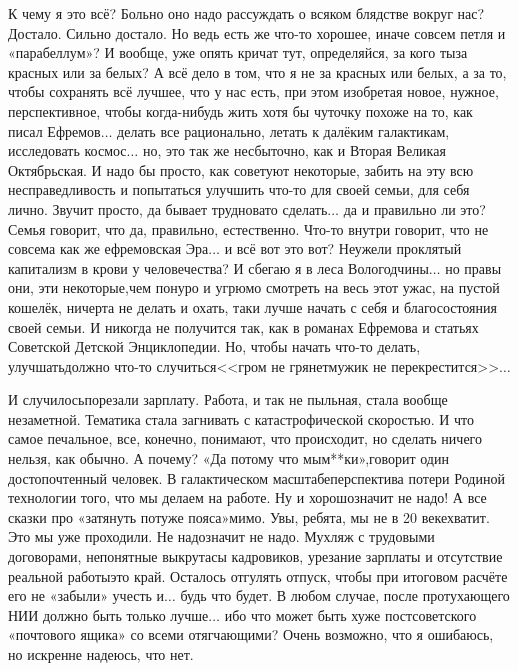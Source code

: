 К чему я это всё? Больно оно надо рассуждать о всяком блядстве вокруг нас? Достало. Сильно достало. Но ведь есть же что-то хорошее, иначе совсем петля и «парабеллум»? И вообще, уже опять кричат тут, определяйся, за кого ты\mdash за красных или за белых? А всё дело в том, что я не за красных или белых, а за то, чтобы сохранять всё лучшее, что у нас есть, при этом изобретая новое, нужное, перспективное, чтобы когда-нибудь жить хотя бы чуточку похоже на то, как писал Ефремов$\ldots$ делать все рационально, летать к далёким галактикам, исследовать космос$\ldots$ но, это так же несбыточно, как и Вторая Великая Октябрьская. И надо бы просто, как советуют некоторые, забить на эту всю несправедливость и попытаться улучшить что-то для своей семьи, для себя лично. Звучит просто, да бывает трудновато сделать$\ldots$ да и правильно ли это? Семья говорит, что да, правильно, естественно. Что-то внутри говорит, что не совсем\mdash а как же ефремовская Эра$\ldots$ и всё вот это вот? Неужели проклятый капитализм в крови у человечества? И сбегаю я в леса Вологодчины$\ldots$ но правы они, эти некоторые,\mdash чем понуро и угрюмо смотреть на весь этот ужас, на пустой кошелёк, ничерта не делать и охать, таки лучше начать с себя и благосостояния своей семьи. И никогда не получится так, как в романах Ефремова и статьях Советской Детской Энциклопедии. Но, чтобы начать что-то делать, улучшать\mdash должно что-то случиться\mdash <<гром не грянет\mdash мужик не перекрестится>>$\ldots$ 

И случилось\mdash порезали зарплату. Работа, и так не пыльная, стала вообще незаметной. Тематика стала загнивать с катастрофической скоростью. И что самое печальное, все, конечно, понимают, что происходит, но сделать ничего нельзя, как обычно. А почему? «Да потому что мы\mdash м**ки»,\mdash говорит один достопочтенный человек. В галактическом масштабе\mdash перспектива потери Родиной технологии того, что мы делаем на работе. Ну и хорошо\mdash значит не надо! А все сказки про «затянуть потуже пояса»\mdash мимо. Увы, ребята, мы не в 20 веке\mdash хватит. Это мы уже проходили. Не надо\mdash значит не надо. Мухляж с трудовыми договорами, непонятные выкрутасы кадровиков, урезание зарплаты и отсутствие реальной работы\mdash это край. Осталось отгулять отпуск, чтобы при итоговом расчёте его не «забыли» учесть и$\ldots$ будь что будет. В любом случае, после протухающего НИИ должно быть только лучше$\ldots$ ибо что может быть хуже постсоветского «почтового ящика» со всеми отягчающими? Очень возможно, что я ошибаюсь, но искренне надеюсь, что нет.

